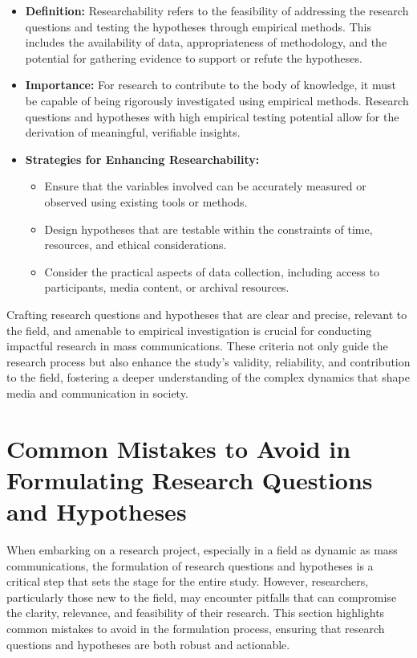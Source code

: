 \documentclass[
]{book}
\providecommand{\tightlist}{%
  \setlength{\itemsep}{0pt}\setlength{\parskip}{0pt}}
\begin{document}
\begin{itemize}
\item
  \textbf{Definition:} Researchability refers to the feasibility of addressing the research questions and testing the hypotheses through empirical methods. This includes the availability of data, appropriateness of methodology, and the potential for gathering evidence to support or refute the hypotheses.
\item
  \textbf{Importance:} For research to contribute to the body of knowledge, it must be capable of being rigorously investigated using empirical methods. Research questions and hypotheses with high empirical testing potential allow for the derivation of meaningful, verifiable insights.
\item
  \textbf{Strategies for Enhancing Researchability:}

  \begin{itemize}
  \tightlist
  \item
    Ensure that the variables involved can be accurately measured or observed using existing tools or methods.
  \item
    Design hypotheses that are testable within the constraints of time, resources, and ethical considerations.
  \item
    Consider the practical aspects of data collection, including access to participants, media content, or archival resources.
  \end{itemize}
\end{itemize}

Crafting research questions and hypotheses that are clear and precise, relevant to the field, and amenable to empirical investigation is crucial for conducting impactful research in mass communications. These criteria not only guide the research process but also enhance the study's validity, reliability, and contribution to the field, fostering a deeper understanding of the complex dynamics that shape media and communication in society.

\hypertarget{common-mistakes-to-avoid-in-formulating-research-questions-and-hypotheses}{%
\section{Common Mistakes to Avoid in Formulating Research Questions and Hypotheses}\label{common-mistakes-to-avoid-in-formulating-research-questions-and-hypotheses}}

When embarking on a research project, especially in a field as dynamic as mass communications, the formulation of research questions and hypotheses is a critical step that sets the stage for the entire study. However, researchers, particularly those new to the field, may encounter pitfalls that can compromise the clarity, relevance, and feasibility of their research. This section highlights common mistakes to avoid in the formulation process, ensuring that research questions and hypotheses are both robust and actionable.
\end{document}
